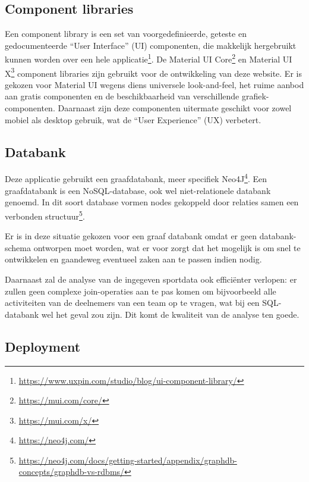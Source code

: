 \subsection{Component libraries}
Een component library is een set van voorgedefinieerde, geteste en gedocumenteerde ``User Interface'' (UI) componenten, die makkelijk hergebruikt kunnen worden over een hele applicatie\footnote{\href{https://www.uxpin.com/studio/blog/ui-component-library/}{https://www.uxpin.com/studio/blog/ui-component-library/}}.
De Material UI Core\footnote{\href{https://mui.com/core/}{https://mui.com/core/}} en Material UI X\footnote{\href{https://mui.com/x/}{https://mui.com/x/}} component libraries zijn gebruikt voor de ontwikkeling van deze website. Er is gekozen voor Material UI wegens diens universele look-and-feel, het ruime aanbod aan gratis componenten en de beschikbaarheid van verschillende grafiek-componenten. Daarnaast zijn deze componenten uitermate geschikt voor zowel mobiel als desktop gebruik, wat de ``User Experience'' (UX) verbetert.

\subsection{Databank}

Deze applicatie gebruikt een graafdatabank, meer specifiek Neo4J\footnote{\href{https://neo4j.com/}{https://neo4j.com/}}.
Een graafdatabank is een NoSQL-database, ook wel niet-relationele databank genoemd. In dit soort database vormen nodes gekoppeld door relaties samen een verbonden  structuur\footnote{\href{https://neo4j.com/docs/getting-started/appendix/graphdb-concepts/graphdb-vs-rdbms/}{https://neo4j.com/docs/getting-started/appendix/graphdb-concepts/graphdb-vs-rdbms/}}.

Er is in deze situatie gekozen voor een graaf databank omdat er geen databank-schema ontworpen moet worden, wat er voor zorgt dat het mogelijk is om snel te ontwikkelen en gaandeweg eventueel zaken aan te passen indien nodig.

Daarnaast zal de analyse van de ingegeven sportdata ook efficiënter verlopen: er zullen geen complexe join-operaties aan te pas komen om bijvoorbeeld alle activiteiten van de deelnemers van een team op te vragen, wat bij een SQL-databank wel het geval zou zijn. Dit komt de kwaliteit van de analyse ten goede.

\subsection{Deployment}

